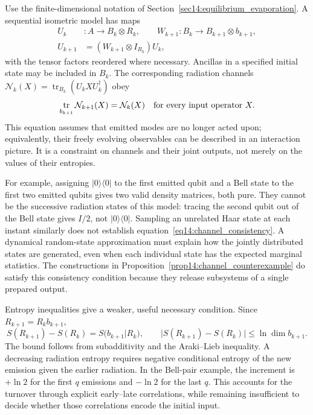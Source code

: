 \documentclass[11pt,letterpaper]{article}
\theoremstyle{plain}
\theoremstyle{definition}
\theoremstyle{remark}
\newcommand{\Ncal}{\mathcal{N}}
\DeclareMathOperator{\tr}{tr}
\begin{document}
Use the finite-dimensional notation of
Section~\ref{sec14:equilibrium_evaporation}. A sequential isometric model
has maps
\begin{equation}
\begin{aligned}
 U_k&:A\longrightarrow B_k\otimes R_k,\qquad
 W_{k+1}:B_k\longrightarrow B_{k+1}\otimes b_{k+1},\\
 U_{k+1}&=(W_{k+1}\otimes I_{R_k})U_k,
\end{aligned}
 \label{eq14:sequential_isometries}
\end{equation}
with the tensor factors reordered where necessary. Ancillas in a
specified initial state may be included in $B_k$. The corresponding
radiation channels $\Ncal_k(X)=\tr_{B_k}(U_kXU_k^\dagger)$ obey
\begin{equation}
 \tr_{b_{k+1}}\Ncal_{k+1}(X)=\Ncal_k(X)
 \quad\hbox{for every input operator }X.
 \label{eq14:channel_consistency}
\end{equation}
This equation assumes that emitted modes are no longer acted upon;
equivalently, their freely evolving observables can be described in an
interaction picture. It is a constraint on channels and their joint
outputs, not merely on the values of their entropies.

For example, assigning $|0\rangle\langle0|$ to the first emitted qubit
and a Bell state to the first two emitted qubits gives two valid
density matrices, both pure. They cannot be the successive radiation
states of this model: tracing the second qubit out of the Bell state
gives $I/2$, not $|0\rangle\langle0|$. Sampling an unrelated Haar state
at each instant similarly does not establish
equation~\eqref{eq14:channel_consistency}. A dynamical random-state
approximation must explain how the jointly distributed states are
generated, even when each individual state has the expected marginal
statistics. The constructions in
Proposition~\ref{prop14:channel_counterexample} do satisfy this
consistency condition because they release subsystems of a single
prepared output.

Entropy inequalities give a weaker, useful necessary condition. Since
$R_{k+1}=R_kb_{k+1}$,
\begin{equation}
 S(R_{k+1})-S(R_k)=S(b_{k+1}|R_k),\qquad
 |S(R_{k+1})-S(R_k)|\leq\ln\dim b_{k+1}.
 \label{eq14:entropy_increment}
\end{equation}
The bound follows from subadditivity and the Araki--Lieb inequality.
A decreasing radiation entropy requires negative conditional entropy
of the new emission given the earlier radiation. In the Bell-pair
example, the increment is $+\ln2$ for the first $q$ emissions and
$-\ln2$ for the last $q$. This accounts for the turnover through
explicit early--late correlations, while remaining insufficient to
decide whether those correlations encode the initial input.
\end{document}
